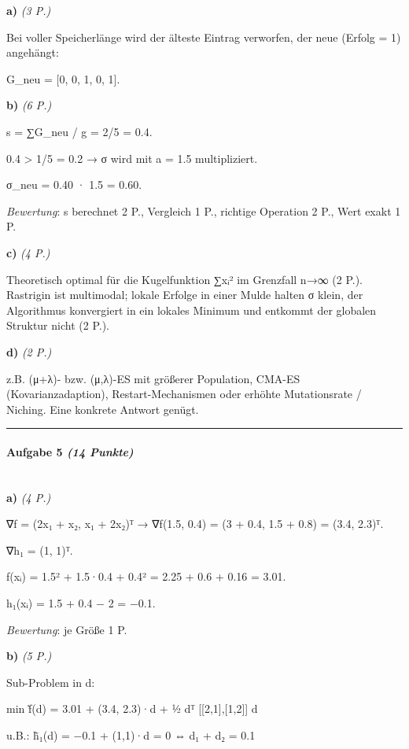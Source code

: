 \documentclass[11pt, a4paper]{article}
\begin{document}
\textbf{a)} \textit{(3 P.)}

Bei voller Speicherlänge wird der älteste Eintrag verworfen, der neue (Erfolg = 1) angehängt:

G\_neu = [0, 0, 1, 0, 1].


\textbf{b)} \textit{(6 P.)}

s = ∑G\_neu / g = 2/5 = 0.4.

0.4 > 1/5 = 0.2 → σ wird mit a = 1.5 multipliziert.

σ\_neu = 0.40 · 1.5 = 0.60.


\textit{Bewertung}: s berechnet 2 P., Vergleich 1 P., richtige Operation 2 P., Wert exakt 1 P.


\textbf{c)} \textit{(4 P.)}

Theoretisch optimal für die Kugelfunktion ∑xᵢ² im Grenzfall n→∞ (2 P.). Rastrigin ist multimodal; lokale Erfolge in einer Mulde halten σ klein, der Algorithmus konvergiert in ein lokales Minimum und entkommt der globalen Struktur nicht (2 P.).


\textbf{d)} \textit{(2 P.)}

z.B. (μ+λ)- bzw. (μ,λ)-ES mit größerer Population, CMA-ES (Kovarianzadaption), Restart-Mechanismen oder erhöhte Mutationsrate / Niching. Eine konkrete Antwort genügt.



\noindent\textcolor{rulegray}{\rule{\linewidth}{0.4pt}}


\paragraph{Aufgabe 5 \textit{(14 Punkte)}}\mbox{}\\[2pt]

\textbf{a)} \textit{(4 P.)}

∇f = (2x₁ + x₂, x₁ + 2x₂)ᵀ → ∇f(1.5, 0.4) = (3 + 0.4, 1.5 + 0.8) = (3.4, 2.3)ᵀ.

∇h₁ = (1, 1)ᵀ.

f(x⃗ᵢ) = 1.5² + 1.5·0.4 + 0.4² = 2.25 + 0.6 + 0.16 = 3.01.

h₁(x⃗ᵢ) = 1.5 + 0.4 − 2 = −0.1.


\textit{Bewertung}: je Größe 1 P.


\textbf{b)} \textit{(5 P.)}

Sub-Problem in d⃗:


min  f̃(d⃗) = 3.01 + (3.4, 2.3)·d⃗ + ½ d⃗ᵀ [[2,1],[1,2]] d⃗

u.B.: h̃₁(d⃗) = −0.1 + (1,1)·d⃗ = 0  ⇔  d₁ + d₂ = 0.1
\end{document}
